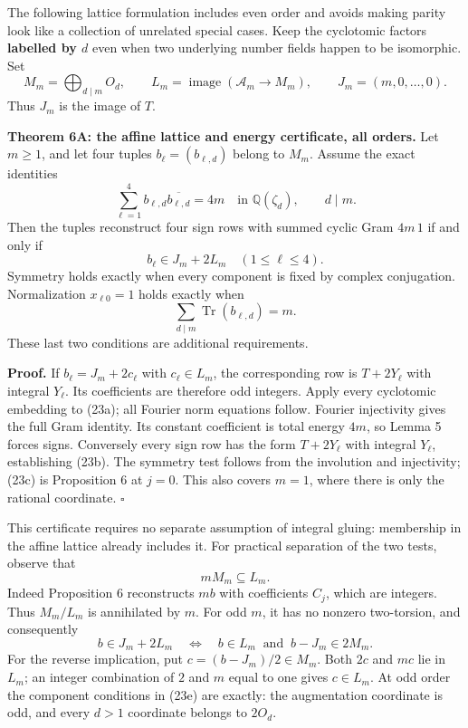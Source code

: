 \documentclass[
  11pt,
]{article}
\begin{document}
The following lattice formulation includes even order and avoids making
parity look like a collection of unrelated special cases. Keep the
cyclotomic factors \textbf{labelled by \(d\)} even when two underlying
number fields happen to be isomorphic. Set \[
 M_m=\bigoplus_{d\mid m}O_d,\qquad
 L_m=\operatorname{image}(\mathcal A_m\longrightarrow M_m),
 \qquad J_m=(m,0,\ldots,0).
 \] Thus \(J_m\) is the image of \(T\).

\textbf{Theorem 6A: the affine lattice and energy certificate, all
orders.} Let \(m\ge1\), and let four tuples \(b_\ell=(b_{\ell,d})\)
belong to \(M_m\). Assume the exact identities \[
 \sum_{\ell=1}^4b_{\ell,d}\overline{b_{\ell,d}}=4m
       \quad\text{in }\mathbb Q(\zeta_d),\qquad d\mid m.   \tag{23a}
\] Then the tuples reconstruct four sign rows with summed cyclic Gram
\(4m\,1\) if and only if \[
                         b_\ell\in J_m+2L_m
                         \quad(1\le\ell\le4).             \tag{23b}
\] Symmetry holds exactly when every component is fixed by complex
conjugation. Normalization \(x_{\ell0}=1\) holds exactly when \[
             \sum_{d\mid m}\operatorname{Tr}(b_{\ell,d})=m.
                                                               \tag{23c}
\] These last two conditions are additional requirements.

\textbf{Proof.} If \(b_\ell=J_m+2c_\ell\) with \(c_\ell\in L_m\), the
corresponding row is \(T+2Y_\ell\) with integral \(Y_\ell\). Its
coefficients are therefore odd integers. Apply every cyclotomic
embedding to (23a); all Fourier norm equations follow. Fourier
injectivity gives the full Gram identity. Its constant coefficient is
total energy \(4m\), so Lemma 5 forces signs. Conversely every sign row
has the form \(T+2Y_\ell\) with integral \(Y_\ell\), establishing (23b).
The symmetry test follows from the involution and injectivity; (23c) is
Proposition 6 at \(j=0\). This also covers \(m=1\), where there is only
the rational coordinate. \(\square\)

This certificate requires no separate assumption of integral gluing:
membership in the affine lattice already includes it. For practical
separation of the two tests, observe that \[
                         mM_m\subseteq L_m.               \tag{23d}
\] Indeed Proposition 6 reconstructs \(mb\) with coefficients \(C_j\),
which are integers. Thus \(M_m/L_m\) is annihilated by \(m\). For odd
\(m\), it has no nonzero two-torsion, and consequently \[
 b\in J_m+2L_m
 \quad\Longleftrightarrow\quad
 b\in L_m\ \text{ and }\ b-J_m\in2M_m.                    \tag{23e}
\] For the reverse implication, put \(c=(b-J_m)/2\in M_m\). Both \(2c\)
and \(mc\) lie in \(L_m\); an integer combination of \(2\) and \(m\)
equal to one gives \(c\in L_m\). At odd order the component conditions
in (23e) are exactly: the augmentation coordinate is odd, and every
\(d>1\) coordinate belongs to \(2O_d\).
\end{document}

